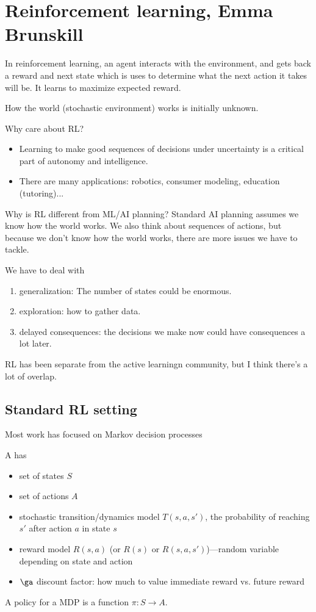 \section{Reinforcement learning, Emma Brunskill}


In reinforcement learning, an agent interacts with the environment, and gets back a reward and next state which is uses to determine what the next action it takes will be. It learns to maximize expected reward.

How the world (stochastic environment) works is initially unknown.

Why care about RL? 
\begin{itemize}
\item
Learning to make good sequences of decisions under uncertainty is a critical part of autonomy and intelligence.
\item
There are many applications: robotics, consumer modeling, education (tutoring)...
\end{itemize}

Why is RL different from ML/AI planning? Standard AI planning assumes we know how the world works. We also think about sequences of actions, but because we don't know how the world works, there are more issues we have to tackle.

We have to deal with 
\begin{enumerate}
\item
generalization: The number of states could be enormous. \item
exploration: how to gather data.
\item
delayed consequences: the decisions we make now could have consequences a lot later.
\end{enumerate}
RL has been separate from the active learningn community, but I think there's a lot of overlap.
\subsection{Standard RL setting}

Most work has focused on Markov decision processes
\begin{df}
A  has
\begin{itemize}
\item
set of states $S$
\item
set of actions $A$
\item
stochastic transition/dynamics model $T(s,a,s')$, the  probability of reaching $s'$ after action $a$ in state $s$
\item
reward model $R(s,a)$ (or $R(s)$ or $R(s,a,s')$)---random variable depending on state and action
\item
$\ga$ discount factor: how much to value immediate reward vs. future reward
\end{itemize}
A policy for a MDP is a function $\pi:S\to A$.
\end{df}

